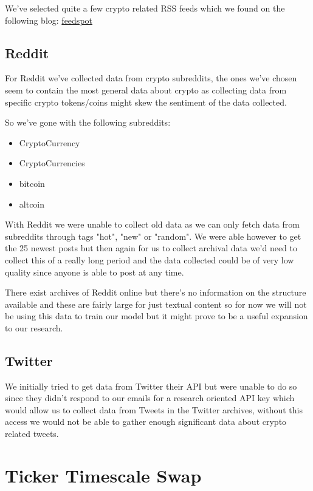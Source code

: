 \documentclass[12pt,a4paper]{article}
\begin{document}
We've selected quite a few crypto related RSS feeds which we found on the following blog: \href{https://blog.feedspot.com/cryptocurrency_rss_feeds/}{feedspot}

\subsection{Reddit}

For Reddit we've collected data from crypto subreddits, the ones we've chosen seem to contain the most general data about crypto as collecting data from specific crypto tokens/coins might skew the sentiment of the data collected.

So we've gone with the following subreddits:
\begin{itemize}
\item CryptoCurrency
\item CryptoCurrencies
\item bitcoin
\item altcoin
\end{itemize}
With Reddit we were unable to collect old data as we can only fetch data from subreddits through tags "hot", "new" or "random". We were able however to get the 25 newest posts but then again for us to collect archival data we'd need to collect this of a really long period and the data collected could be of very low quality since anyone is able to post at any time.

There exist archives of Reddit online but there's no information on the structure available and these are fairly large for just textual content so for now we will not be using this data to train our model but it might prove to be a useful expansion to our research.

\subsection{Twitter}

We initially tried to get data from Twitter their API but were unable to do so since they didn't respond to our emails for a research oriented API key which would allow us to collect data from Tweets in the Twitter archives, without this access we would not be able to gather enough significant data about crypto related tweets.

\section{Ticker Timescale Swap}
\end{document}
